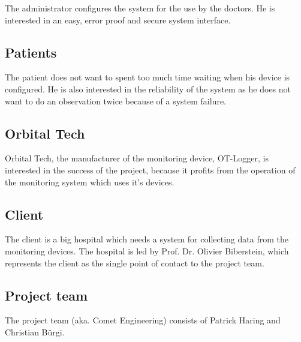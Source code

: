 \documentclass[fontsize=12pt,
               paper=a4,
               twoside=false,
               parskip=half,
               ]{scrartcl}
\begin{document}
The administrator configures the system for the use by the doctors. He is interested in an easy, error proof and secure system interface.

\subsection{Patients}

The patient does not want to spent too much time waiting when his device is configured. He is also interested in the reliability of the system as he does not want to do an observation twice because of a system failure.

\subsection{Orbital Tech}

Orbital Tech, the manufacturer of the monitoring device, OT-Logger, is interested in the success of the project, because it profits from the operation of the monitoring system which uses it's devices.

\subsection{Client}

The client is a big hospital which needs a system for collecting data from the monitoring devices. The hospital is led by Prof. Dr. Olivier Biberstein, which represents the client as the single point of contact to the project team.

\subsection{Project team}

The project team (aka. Comet Engineering) consists of Patrick Haring and Christian Bürgi.
\end{document}
